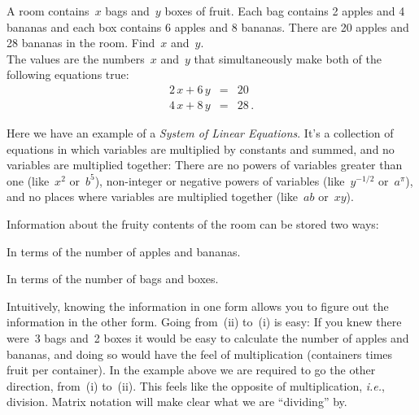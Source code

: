 \begin{example} 
A room contains~$x$ bags and~$y$ boxes of fruit. 
Each bag contains 2 apples and 4 bananas and each box contains 6 apples and 8 bananas. 
There are 20 apples and 28 bananas in the room. Find~$x$ and~$y$.
\\


\noindent
The values are the numbers~$x$ and~$y$ that simultaneously make both of the following equations true:
\begin{eqnarray*}
	2\, x + 6\, y & =  & 20 \\
	4\, x + 8\, y & = & 28\, .
\end{eqnarray*}
\end{example}
Here we have an example of a \emph{System of Linear Equations}.  It's a collection of equations in which variables are multiplied by constants and summed, and no variables are multiplied together:  There are no powers of variables greater than one (like~$x^2$ or~$b^5$), non-integer or negative powers of variables (like~$y^{-1/2}$ or~$a^{\pi}$), and no places where variables are multiplied together (like~$ab$ or~$xy$).

%
\noindent
Information about the fruity contents of the room can be stored two ways: 
\begin{enumext}[label=\roman*,wrap-label=(#1)]
\item In terms of the number of apples and bananas. 
\item In terms of the number of bags and boxes. 
\end{enumext}
Intuitively, knowing the information in one form allows you to figure out the information in the other form. 
Going from~(ii) to~(i) is easy: 
If you knew there were~3 bags and~2 boxes it would be easy to calculate the number of apples and bananas, and doing so would have the feel of multiplication (containers times fruit per container). 
In the example above we are required to go the other direction, from~(i) to~(ii). This  feels like the opposite of multiplication, {\it i.e.}, division. Matrix notation will 
make clear what we are ``dividing'' by. 

